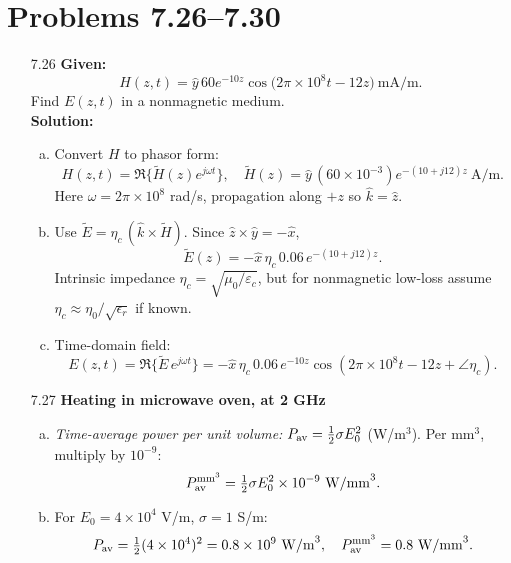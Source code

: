 \section*{Problems 7.26--7.30}
\begin{enumerate}

\item[7.26] \textbf{Given:}
\[H(z,t)=\hat y\,60e^{-10z}\cos\bigl(2\pi\times10^8t-12z\bigr)~\mathrm{mA/m}.\]
Find $E(z,t)$ in a nonmagnetic medium.  
\\
\textbf{Solution:}
\begin{enumerate}[(a)]
  \item Convert $H$ to phasor form:
  \[H(z,t)=\Re\{\tilde H(z)e^{j\omega t}\},\quad 
    \tilde H(z)=\hat y\,(60\times10^{-3})e^{-(10+j12)z}~\mathrm{A/m}.\]
  Here $\omega=2\pi\times10^8$ rad/s, propagation along $+z$ so $\hat k=\hat z$.
  
  \item Use $\tilde E=\eta_c\,(\hat k\times\tilde H)$.  Since $\hat z\times\hat y=-\hat x$,
  \[\tilde E(z)=-\hat x\,\eta_c\,0.06\,e^{-(10+j12)z}.\]
  Intrinsic impedance $\eta_c=\sqrt{\mu_0/\varepsilon_c}$, but for nonmagnetic low-loss assume $\eta_c\approx\eta_0/\sqrt{\epsilon_r}$ if known.  
  
  \item Time-domain field:
  \[E(z,t)=\Re\{\tilde E\,e^{j\omega t}\}
    =-\hat x\,\eta_c\,0.06\,e^{-10z}\cos(2\pi\times10^8t-12z+\angle\eta_c).\]
\end{enumerate}

\item[7.27] \textbf{Heating in microwave oven, at 2 GHz}\smallskip
\\
\begin{enumerate}[(a)]
  \item \emph{Time-average power per unit volume:}
  $P_{\rm av}=\tfrac12\sigma E_0^2$ (W/m$^3$).  Per mm$^3$, multiply by $10^{-9}$:
  \[P_{\rm av}^{\mathrm{mm}^3}=\tfrac12\sigma E_0^2\times10^{-9}~\mathrm{W/mm}^3.\]
  \item For $E_0=4\times10^4$ V/m, $\sigma=1$ S/m:
  \[P_{\rm av}=\tfrac12(4\times10^4)^2=0.8\times10^9~\mathrm{W/m}^3,\quad
    P_{\rm av}^{\mathrm{mm}^3}=0.8~\mathrm{W/mm}^3.\]
\end{enumerate}


\end{enumerate}
